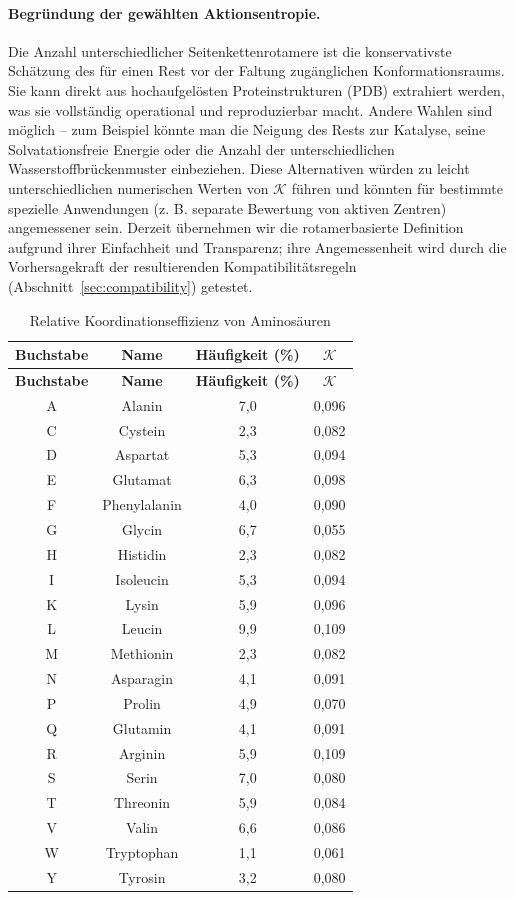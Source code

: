 \documentclass[12pt,a4paper]{article}
\newcommand{\REL}{\mathcal{K}}          %
\begin{document}
	\paragraph{Begründung der gewählten Aktionsentropie.}
	Die Anzahl unterschiedlicher Seitenkettenrotamere ist die konservativste Schätzung des für einen Rest vor der Faltung zugänglichen Konformationsraums. Sie kann direkt aus hochaufgelösten Proteinstrukturen (PDB) extrahiert werden, was sie vollständig operational und reproduzierbar macht. Andere Wahlen sind möglich – zum Beispiel könnte man die Neigung des Rests zur Katalyse, seine Solvatationsfreie Energie oder die Anzahl der unterschiedlichen Wasserstoffbrückenmuster einbeziehen. Diese Alternativen würden zu leicht unterschiedlichen numerischen Werten von \(\REL\) führen und könnten für bestimmte spezielle Anwendungen (z. B. separate Bewertung von aktiven Zentren) angemessener sein. Derzeit übernehmen wir die rotamerbasierte Definition aufgrund ihrer Einfachheit und Transparenz; ihre Angemessenheit wird durch die Vorhersagekraft der resultierenden Kompatibilitätsregeln (Abschnitt~\ref{sec:compatibility}) getestet.
	
	\begin{longtable}{|c|c|c|c|}
		\caption{Relative Koordinationseffizienz von Aminosäuren}\label{tab:amino}\\
		\hline
		\textbf{Buchstabe} & \textbf{Name} & \textbf{Häufigkeit (\%)} & \(\REL\) \\
		\hline
		\endfirsthead
		\hline
		\textbf{Buchstabe} & \textbf{Name} & \textbf{Häufigkeit (\%)} & \(\REL\) \\
		\hline
		\endhead
		\hline
		A & Alanin & 7,0 & 0,096 \\
		C & Cystein & 2,3 & 0,082 \\
		D & Aspartat & 5,3 & 0,094 \\
		E & Glutamat & 6,3 & 0,098 \\
		F & Phenylalanin & 4,0 & 0,090 \\
		G & Glycin & 6,7 & 0,055 \\
		H & Histidin & 2,3 & 0,082 \\
		I & Isoleucin & 5,3 & 0,094 \\
		K & Lysin & 5,9 & 0,096 \\
		L & Leucin & 9,9 & 0,109 \\
		M & Methionin & 2,3 & 0,082 \\
		N & Asparagin & 4,1 & 0,091 \\
		P & Prolin & 4,9 & 0,070 \\
		Q & Glutamin & 4,1 & 0,091 \\
		R & Arginin & 5,9 & 0,109 \\
		S & Serin & 7,0 & 0,080 \\
		T & Threonin & 5,9 & 0,084 \\
		V & Valin & 6,6 & 0,086 \\
		W & Tryptophan & 1,1 & 0,061 \\
		Y & Tyrosin & 3,2 & 0,080 \\
		\hline
	\end{longtable}
	
\end{document}
